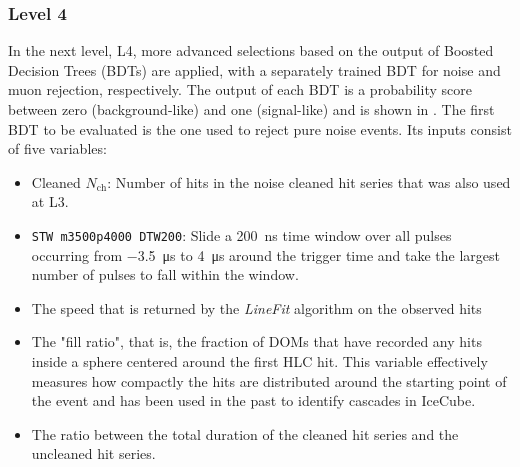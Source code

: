 \subsubsection{Level 4}
\label{sec:level4-selection}
In the next level, L4, more advanced selections based on the output of Boosted Decision Trees (BDTs) are applied, with a separately trained BDT for noise and muon rejection, respectively.
The output of each BDT is a probability score between zero (background-like) and one (signal-like) and is shown in .
The first BDT to be evaluated is the one used to reject pure noise events.
Its inputs consist of five variables:
\begin{itemize}
    \item Cleaned $N_\mathrm{ch}$: Number of hits in the noise cleaned hit series that was also used at L3.
    \item \texttt{STW m3500p4000 DTW200}: Slide a \SI{200}{\nano\second} time window over all pulses occurring from \SI{-3.5}{\micro\second} to \SI{4}{\micro\second} around the trigger time and take the largest number of pulses to fall within the window.
    \item The speed that is returned by the \emph{LineFit} algorithm\cite{linefit} on the observed hits
    \item The "fill ratio", that is, the fraction of DOMs that have recorded any hits inside a sphere centered around the first HLC hit.
    This variable effectively measures how compactly the hits are distributed around the starting point of the event and has been used in the past to identify cascades in IceCube\cite{icecube_2011}.
    \item The ratio between the total duration of the cleaned hit series and the uncleaned hit series.
\end{itemize}
